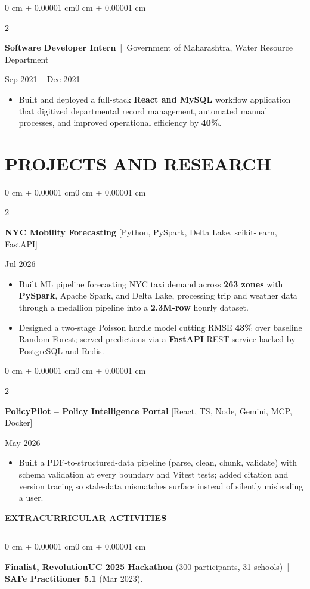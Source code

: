 \documentclass[10pt, letterpaper]{article}
\newenvironment{highlights}{
    \begin{itemize}[
        topsep=0.08 cm,
        parsep=0.04 cm,
        partopsep=0pt,
        itemsep=0.04 cm,
        leftmargin=12pt
    ]
}{
    \end{itemize}
}
\newenvironment{onecolentry}{
    \begin{adjustwidth}{0 cm + 0.00001 cm}{0 cm + 0.00001 cm}
}{
    \end{adjustwidth}
}
\newenvironment{twocolentry}[2][]{
    \onecolentry
    \def\secondColumn{#2}
    \setcolumnwidth{\fill, 4.5 cm}
    \begin{paracol}{2}
}{
    \switchcolumn \raggedleft \secondColumn
    \end{paracol}
    \endonecolentry
}
\begin{document}
\vspace{0.12 cm}

\begin{twocolentry}{Sep 2021 -- Dec 2021}
\textbf{Software Developer Intern} \,|\, Government of Maharashtra, Water Resource Department
\end{twocolentry}
\begin{highlights}
  \item Built and deployed a full-stack \textbf{React and MySQL} workflow application that digitized departmental record management, automated manual processes, and improved operational efficiency by \textbf{40\%}.
\end{highlights}

\section{PROJECTS AND RESEARCH}
\begin{twocolentry}{Jul 2026}
\textbf{NYC Mobility Forecasting} [Python, PySpark, Delta Lake, scikit-learn, FastAPI]
\end{twocolentry}
\begin{highlights}
  \item Built ML pipeline forecasting NYC taxi demand across \textbf{263 zones} with \textbf{PySpark}, Apache Spark, and Delta Lake, processing trip and weather data through a medallion pipeline into a \textbf{2.3M-row} hourly dataset.
  \item Designed a two-stage Poisson hurdle model cutting RMSE \textbf{43\%} over baseline Random Forest; served predictions via a \textbf{FastAPI} REST service backed by PostgreSQL and Redis.
\end{highlights}

\vspace{0.12 cm}

\begin{twocolentry}{May 2026}
\textbf{PolicyPilot -- Policy Intelligence Portal} [React, TS, Node, Gemini, MCP, Docker]
\end{twocolentry}
\begin{highlights}
  \item Built a PDF-to-structured-data pipeline (parse, clean, chunk, validate) with schema validation at every boundary and Vitest tests; added citation and version tracing so stale-data mismatches surface instead of silently misleading a user.
\end{highlights}

{\bfseries\large EXTRACURRICULAR ACTIVITIES}\vspace{1pt}\hrule\vspace{0.06 cm}
\begin{onecolentry}
\textbf{Finalist, RevolutionUC 2025 Hackathon} (300 participants, 31 schools) \,|\, \textbf{SAFe Practitioner 5.1} (Mar 2023).
\end{onecolentry}
\end{document}
